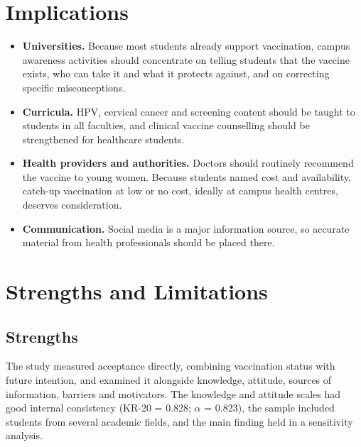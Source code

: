 \section{Implications}
\begin{itemize}[leftmargin=*,itemsep=2pt]
\item \textbf{Universities.} Because most students already support vaccination, campus awareness activities should concentrate on telling students that the vaccine exists, who can take it and what it protects against, and on correcting specific misconceptions.
\item \textbf{Curricula.} HPV, cervical cancer and screening content should be taught to students in all faculties, and clinical vaccine counselling should be strengthened for healthcare students.
\item \textbf{Health providers and authorities.} Doctors should routinely recommend the vaccine to young women. Because students named cost and availability, catch-up vaccination at low or no cost, ideally at campus health centres, deserves consideration.
\item \textbf{Communication.} Social media is a major information source, so accurate material from health professionals should be placed there.
\end{itemize}

\section{Strengths and Limitations}
\subsection*{Strengths}
The study measured acceptance directly, combining vaccination status with future intention, and examined it alongside knowledge, attitude, sources of information, barriers and motivators. The knowledge and attitude scales had good internal consistency (KR-20 = 0.828; $\alpha$ = 0.823), the sample included students from several academic fields, and the main finding held in a sensitivity analysis.

